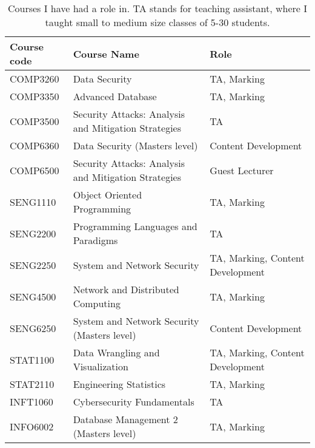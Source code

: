 \documentclass{myresume}
\begin{document}
        \begin{table}[H]
            \caption{Courses I have had a role in. TA stands for teaching assistant, where I taught small to medium size classes of 5-30 students.}
            \begin{center}
            \begin{tabular}{ l | l | l }
                    \hline
                    \textbf{Course code} & \textbf{Course Name} & \textbf{Role} \\
                    \hline
                    \hline
                    COMP3260 & Data Security & TA, Marking \\
                    \hline
                    COMP3350 & Advanced Database & TA, Marking \\
                    \hline
                    COMP3500 & Security Attacks: Analysis and Mitigation Strategies & TA \\
                    \hline
                    COMP6360 & Data Security (Masters level) & Content Development \\
                    \hline
                    COMP6500 & Security Attacks: Analysis and Mitigation Strategies & Guest Lecturer \\
                    \hline
                    SENG1110 & Object Oriented Programming & TA, Marking \\
                    \hline
                    SENG2200 & Programming Languages and Paradigms & TA \\
                    \hline
                    SENG2250 & System and Network Security & TA, Marking, Content Development \\
                    \hline
                    SENG4500 & Network and Distributed Computing & TA, Marking \\
                    \hline
                    SENG6250 & System and Network Security (Masters level) & Content Development \\
                    \hline
                    STAT1100 & Data Wrangling and Visualization & TA, Marking, Content Development \\
                    \hline
                    STAT2110 & Engineering Statistics & TA, Marking \\
                    \hline
                    INFT1060 & Cybersecurity Fundamentals & TA \\
                    \hline
                    INFO6002 & Database Management 2 (Masters level) & TA, Marking \\
                    \hline
            \end{tabular}
            \end{center}
        \end{table}



    	
	\nocite{*}
	
\end{document}

